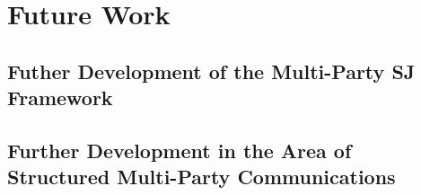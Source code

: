 \chapter{Future Work}
\label{ch:futurework}

\section{Futher Development of the Multi-Party SJ Framework}

\section{Further Development in the Area of Structured Multi-Party Communications}